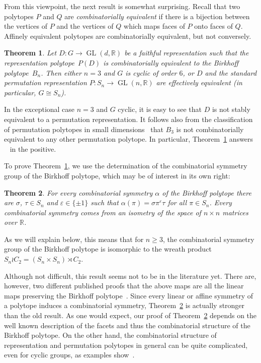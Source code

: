 \documentclass[ALCO,Unicode]{cedram}
\newtheorem{introthm}{Theorem}
\newcommand{\eps}{\varepsilon}
\renewcommand{\geq}{\geqslant}
\newcommand{\reals}{\mathbb{R}}
\newcommand{\iso}{\cong}    %
\DeclareMathOperator{\GL}{GL}
\begin{document}
From this viewpoint, the next result is somewhat surprising.
Recall that two polytopes 
$P$ and $Q$ are
\emph{combinatorially equivalent}
if there is a bijection between the vertices of $P$
and the vertices of $Q$ which maps faces of $P$
onto faces of $Q$.
Affinely equivalent polytopes are combinatorially equivalent,
but not conversely.

\begin{introthm}\label{main:birkhoff_unique}
  Let $D\colon G\to \GL(d,\reals)$ be 
  a faithful representation such that
  the representation polytope~$P(D)$ is combinatorially equivalent
  to the Birkhoff polytope~$B_n$.
  Then either $n=3$ and $G$ is cyclic of order $6$,
  or $D$ and the standard permutation representation
  $P\colon S_n \to \GL(n,\reals)$ 
  are effectively equivalent  
  (in particular, $G\iso S_n$).
\end{introthm}

In the exceptional case $n=3$ and $G$ cyclic, it is easy to see that
$D$ is not stably equivalent to a permutation representation.
It follows also from the classification of permutation polytopes
in small dimensions~\cite[Theorem~4.1]{BHNP09}
that $B_3$ is not combinatorially equivalent 
to any other permutation polytope.
In particular, Theorem~\ref{main:birkhoff_unique} 
answers ~\cite[Conjecture~5.3]{BHNP09} in the positive.

To prove Theorem~\ref{main:birkhoff_unique}, 
we use the determination of the 
combinatorial symmetry group of the Birkhoff polytope,
which may be of interest in its own right:

\begin{introthm}\label{main:birkhoff_symgrp}
  For every combinatorial symmetry $\alpha$ of 
  the Birkhoff polytope 
  there are $\sigma$, $\tau\in S_n$ and $\eps\in \{\pm 1\}$
  such that $\alpha(\pi)= \sigma \pi^{\eps} \tau$
  for all $\pi\in S_n$.  
  Every combinatorial symmetry comes from an isometry of
  the space of $n\times n$ matrices over $\reals$.
\end{introthm}

As we will explain below, this means that for $n\geq 3$,
the combinatorial symmetry group of the Birkhoff polytope
is isomorphic to the wreath product 
$S_n \wr C_2 = (S_n \times S_n)\rtimes C_2$.

Although not difficult, this result seems not to be in the literature
yet.
There are, however, two different published proofs 
that the above maps 
are all the linear maps preserving the Birkhoff 
polytope~\cite{LiSpiZobin04,LiTamTsing02}.
Since every linear or affine symmetry of a polytope 
induces a combinatorial symmetry,
Theorem~\ref{main:birkhoff_symgrp} 
is actually stronger than the old result.
As one would expect, our proof of Theorem~\ref{main:birkhoff_symgrp}
depends on the well known description of 
the facets and thus the combinatorial structure
of the Birkhoff polytope.
On the other hand, the combinatorial structure of 
representation and permutation polytopes in general 
can be quite complicated,
even for cyclic groups, as examples show~\cite{BHNP11pre}.
\end{document}
